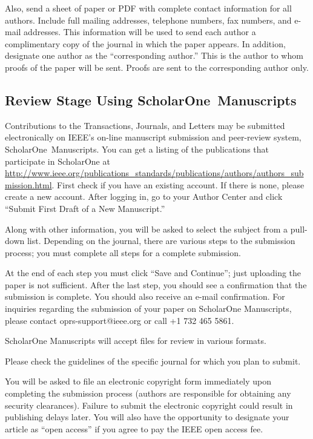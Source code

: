 \documentclass[journal,twoside,web]{ieeecolor2}
\begin{document}
Also, send a sheet of paper or PDF with complete contact information for all 
authors.
Include full mailing addresses, telephone numbers, fax numbers, and 
e-mail addresses.
This information will be used to send each author a 
complimentary copy of the journal in which the paper appears.
In addition, 
designate one author as the ``corresponding author.'' This is the author to 
whom proofs of the paper will be sent.
Proofs are sent to the corresponding 
author only.

\subsection{Review Stage Using ScholarOne\textregistered\ Manuscripts}
Contributions to the Transactions, Journals, and Letters may be submitted 
electronically on IEEE's on-line manuscript submission and peer-review 
system, ScholarOne\textregistered\ Manuscripts.
You can get a listing of the 
publications that participate in ScholarOne at 
\underline{http://www.ieee.org/publications\_standards/publications/}\discretionary{}{}{}\underline{authors/authors\_submission.html}.
First check if you have an existing account.
If there is none, please create 
a new account.
After logging in, go to your Author Center and click ``Submit 
First Draft of a New Manuscript.'' 

Along with other information, you will be asked to select the subject from a 
pull-down list.
Depending on the journal, there are various steps to the 
submission process; you must complete all steps for a complete submission.

At the end of each step you must click ``Save and Continue''; just uploading 
the paper is not sufficient.
After the last step, you should see a 
confirmation that the submission is complete.
You should also receive an 
e-mail confirmation.
For inquiries regarding the submission of your paper on 
ScholarOne Manuscripts, please contact oprs-support@ieee.org or call +1 732 
465 5861.

ScholarOne Manuscripts will accept files for review in various formats.

Please check the guidelines of the specific journal for which you plan to 
submit.

You will be asked to file an electronic copyright form immediately upon 
completing the submission process (authors are responsible for obtaining any 
security clearances).
Failure to submit the electronic copyright could 
result in publishing delays later.
You will also have the opportunity to 
designate your article as ``open access'' if you agree to pay the IEEE open 
access fee.
\end{document}

